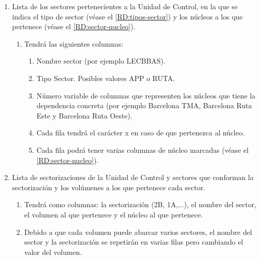 \begin{enumerate}[label={\textbf{RIO\arabic*}}, ref={Requisito RIO\arabic*},  align=left]
\begin{enumerate}[label*={\textbf{.\arabic*}}]
		\item Lista de los sectores pertenecientes a la Unidad de Control, en la que se indica el tipo de sector (véase el \ref{RD:tipos-sector}) y los núcleos a los que pertenece (véase el \ref{RD:sector-nucleo}).
		\begin{enumerate}[label*={\textbf{.\arabic*}}]
			\item Tendrá las siguientes columnas: 
			\begin{enumerate}[label*={\textbf{.\arabic*}}]
				\item Nombre sector (por ejemplo LECBBAS).
				\item Tipo Sector. Posibles valores APP o RUTA.
				\item Número variable de columnas que representen los núcleos que tiene la dependencia concreta (por ejemplo Barcelona TMA, Barcelona Ruta Este y Barcelona Ruta Oeste).
				\item Cada fila tendrá el carácter x en caso de que pertenezca al núcleo.
				\item Cada fila podrá tener varias columnas de núcleo marcadas (véase el \ref{RD:sector-nucleo}).
			\end{enumerate}
		\end{enumerate}
		\item Lista de sectorizaciones de la Unidad de Control y sectores que conforman la sectorización y los volúmenes a los que pertenece cada sector.
		\begin{enumerate}[label*={\textbf{.\arabic*}}]
			\item Tendrá como columnas: la sectorización (2B, 1A,...), el nombre del sector, el volumen al que pertenece y el núcleo al que pertenece.
			\item Debido a que cada volumen puede abarcar varios sectores, el nombre del sector y la sectorización se repetirán en varias filas pero cambiando el valor del volumen.
		\end{enumerate}
	\end{enumerate}
	

\end{enumerate}
